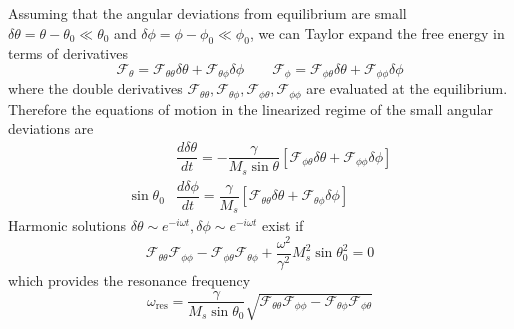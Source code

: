 \documentclass[aps,prb,onecolumn,notitlepage,showpacs,floatfix,superscriptaddress]{revtex4-1}
\newcommand{\mrm}[1]{\mathrm{#1}}
\newcommand{\sint}{\sin\theta}
\newcommand{\fe}{ \mathcal{F}}
\begin{document}
Assuming that the angular deviations from equilibrium are small $\delta\theta = \theta - \theta_0 \ll \theta_0$ and $\delta\phi = \phi - \phi_0 \ll \phi_0$, we can Taylor expand the free energy in terms of derivatives
\begin{equation}
\fe_\theta = \fe_{\theta \theta} \delta\theta +  \fe_{\theta \phi} \delta\phi \qquad  \fe_\phi = \fe_{\phi \theta} \delta\theta +  \fe_{\phi \phi} \delta\phi
\end{equation}
where the double derivatives $\fe_{\theta \theta}, \fe_{\theta \phi},\fe_{\phi \theta}, \fe_{\phi \phi}$ are evaluated at the equilibrium. Therefore the equations of motion in the linearized regime of the small angular deviations are
\begin{equation}
\begin{split}
&\dfrac{d\delta \theta}{dt} = -\dfrac{\gamma}{M_s \sint} \left[ \fe_{\phi \theta} \delta\theta +  \fe_{\phi \phi} \delta\phi \right] \\
\sint_0 &\dfrac{d\delta\phi}{dt}  =  \dfrac{\gamma}{M_s} \left[ \fe_{\theta \theta} \delta\theta +  \fe_{\theta \phi} \delta\phi  \right]
\end{split}
\end{equation}
Harmonic solutions $\delta\theta \sim e^{-i\omega t}, \delta\phi \sim e^{-i\omega t}$ exist if
\begin{equation}
\fe_{\theta \theta} \fe_{\phi \phi}- \fe_{\phi \theta} \fe_{\theta \phi} + \dfrac{\omega^2}{\gamma^2} M_s^2 \sint_0^2 =0
\end{equation}
which provides the resonance frequency
\begin{equation}
\omega_\mrm{res} = \dfrac{\gamma}{M_s \sint_0} \sqrt{\fe_{\theta \theta} \fe_{\phi \phi}-  \fe_{\theta \phi}\fe_{\phi \theta}}
\end{equation}
\end{document}
